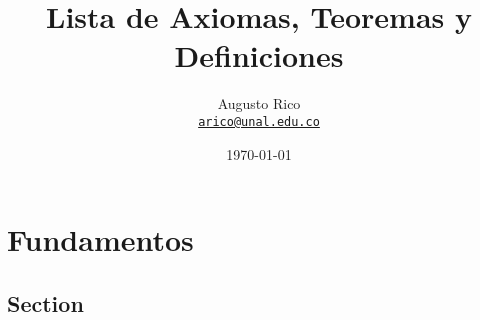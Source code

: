 \documentclass[11pt]{book}
\title{Lista de Axiomas, Teoremas y Definiciones
}
\author{Augusto Rico\\
    \href{mailto:arico@unal.edu.co}{\texttt{arico@unal.edu.co}}}
\date{\today}
\begin{document}
\maketitle

\tableofcontents

\chapter{Fundamentos}
\section{Section}
\begin{flushleft}
    
\end{flushleft}


\newpage

\medskip

 

\newpage
\end{document}
